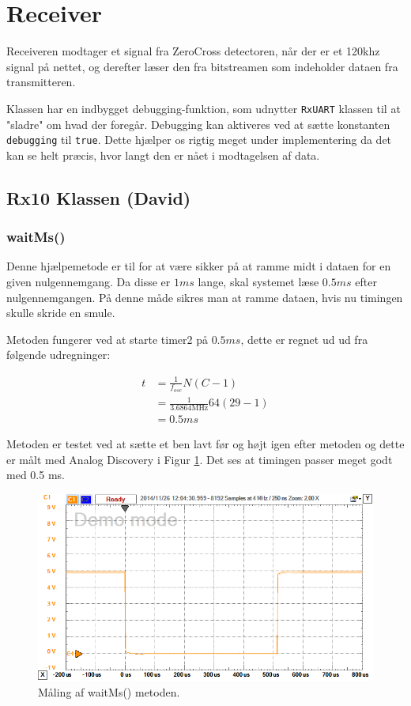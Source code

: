 \section{Receiver} \label{Rx}
Receiveren modtager et signal fra ZeroCross detectoren, når der er et 120khz signal på nettet, og derefter læser den fra bitstreamen som indeholder dataen fra transmitteren.

Klassen har en indbygget debugging-funktion, som udnytter \texttt{RxUART} klassen til at "sladre" om hvad der foregår. Debugging kan aktiveres ved at sætte konstanten \texttt{debugging} til \texttt{true}. Dette hjælper os rigtig meget under implementering da det kan se helt præcis, hvor langt den er nået i modtagelsen af data.

\subsection{Rx10 Klassen (David)}

\subsubsection{waitMs()}

Denne hjælpemetode er til for at være sikker på at ramme midt i dataen for en given nulgennemgang.
Da disse er $1 ms$ lange, skal systemet læse $0.5 ms$ efter nulgennemgangen.
På denne måde sikres man at ramme dataen, hvis nu timingen skulle skride en smule.

Metoden fungerer ved at starte timer2 på $0.5 ms$, dette er regnet ud ud fra følgende udregninger:

\begin{align*}
t &= \frac{1}{f_{osc}} N (C - 1)\\
 &= \frac{1}{3.6864 \text{MHz}} 64 (29 - 1) \\
 &= 0.5 ms
\end{align*}

Metoden er testet ved at sætte et ben lavt før og højt igen efter metoden og dette er målt med Analog Discovery i Figur \ref{fig:RxwaitMStest}. 
Det ses at timingen passer meget godt med 0.5 ms.

\begin{figure}[h]
\centering
\includegraphics[width=\textwidth]{../Implementering/SW_implementering/Receiver/Rx10}
\caption{Måling af waitMs() metoden.}
\label{fig:RxwaitMStest}
\end{figure}

